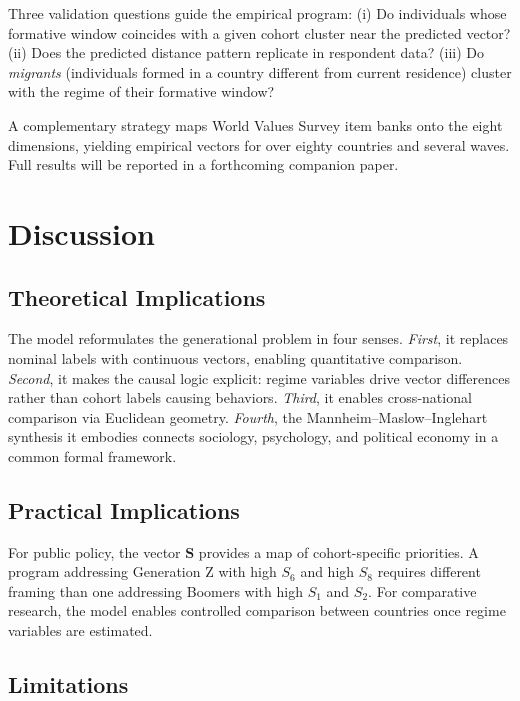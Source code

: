 \documentclass[conference]{IEEEtran}
\begin{document}
Three validation questions guide the empirical program: (i) Do individuals whose formative window coincides with a given cohort cluster near the predicted vector? (ii) Does the predicted distance pattern replicate in respondent data? (iii) Do \textit{migrants} (individuals formed in a country different from current residence) cluster with the regime of their formative window?

A complementary strategy maps World Values Survey \cite{wvs2022} item banks onto the eight dimensions, yielding empirical vectors for over eighty countries and several waves. Full results will be reported in a forthcoming companion paper.

\section{Discussion}
\label{sec:discussion}

\subsection{Theoretical Implications}

The model reformulates the generational problem in four senses. \textit{First}, it replaces nominal labels with continuous vectors, enabling quantitative comparison. \textit{Second}, it makes the causal logic explicit: regime variables drive vector differences rather than cohort labels causing behaviors. \textit{Third}, it enables cross-national comparison via Euclidean geometry. \textit{Fourth}, the Mannheim--Maslow--Inglehart synthesis it embodies connects sociology, psychology, and political economy in a common formal framework.

\subsection{Practical Implications}

For public policy, the vector $\mathbf{S}$ provides a map of cohort-specific priorities. A program addressing Generation Z with high $S_6$ and high $S_8$ requires different framing than one addressing Boomers with high $S_1$ and $S_2$. For comparative research, the model enables controlled comparison between countries once regime variables are estimated.

\subsection{Limitations}
\end{document}
